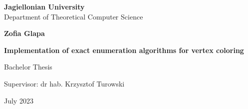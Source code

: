 \begin{titlepage}
	\begin{center}
        
		\large
		\textbf{Jagiellonian University}\\
		Department of Theoretical Computer Science\\

		\vspace{1.5cm}

		\Large
		\textbf{Zofia Glapa}

		\vspace*{2cm}

		\textbf{\LARGE Implementation of exact enumeration algorithms for vertex coloring}
		
		\vspace{0.5cm}
		\large
		
		\vfill
		\Large
		Bachelor Thesis

		\vfill
		\Large
		Supervisor: dr hab. Krzysztof Turowski
		
		\vspace{0.8cm}
		
		July 2023
		
\end{center}
\end{titlepage}